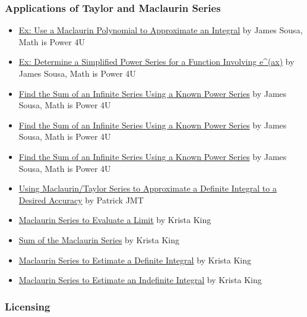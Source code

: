 \subsubsection{Applications of Taylor and Maclaurin Series}
\label{sss:appl-916e}


\begin{itemize}
    \item \href{https://www.youtube.com/watch?v=Ifnnuk6UeNE}{Ex: Use a Maclaurin Polynomial to Approximate an Integral} by James Sousa, Math is Power 4U
    \item \href{https://www.youtube.com/watch?v=vfrwoCGdXSo}{Ex: Determine a Simplified Power Series for a Function Involving e^(ax)} by James Sousa, Math is Power 4U
    \item \href{https://www.youtube.com/watch?v=5RpUtQBFNdM}{Find the Sum of an Infinite Series Using a Known Power Series} by James Sousa, Math is Power 4U
    \item \href{https://www.youtube.com/watch?v=Wv0SuLhHa4k}{Find the Sum of an Infinite Series Using a Known Power Series} by James Sousa, Math is Power 4U
    \item \href{https://www.youtube.com/watch?v=XN_CqqH89eU}{Find the Sum of an Infinite Series Using a Known Power Series} by James Sousa, Math is Power 4U
    \item \href{https://www.youtube.com/watch?v=3ZOS69YTxQ8}{Using Maclaurin/Taylor Series to Approximate a Definite Integral to a Desired Accuracy} by Patrick JMT
    \item \href{https://www.youtube.com/watch?v=7TFpx8DbfUQ}{Maclaurin Series to Evaluate a Limit} by Krista King
    \item \href{https://www.youtube.com/watch?v=dZhqQbqLxks}{Sum of the Maclaurin Series} by Krista King
    \item \href{https://www.youtube.com/watch?v=Tq6pNCwI0cM}{Maclaurin Series to Estimate a Definite Integral} by Krista King
    \item \href{https://www.youtube.com/watch?v=4WEGEC7mpQU}{Maclaurin Series to Estimate an Indefinite Integral} by Krista King
\end{itemize}


\subsubsection{Licensing}
\label{sss:lice-7352}


